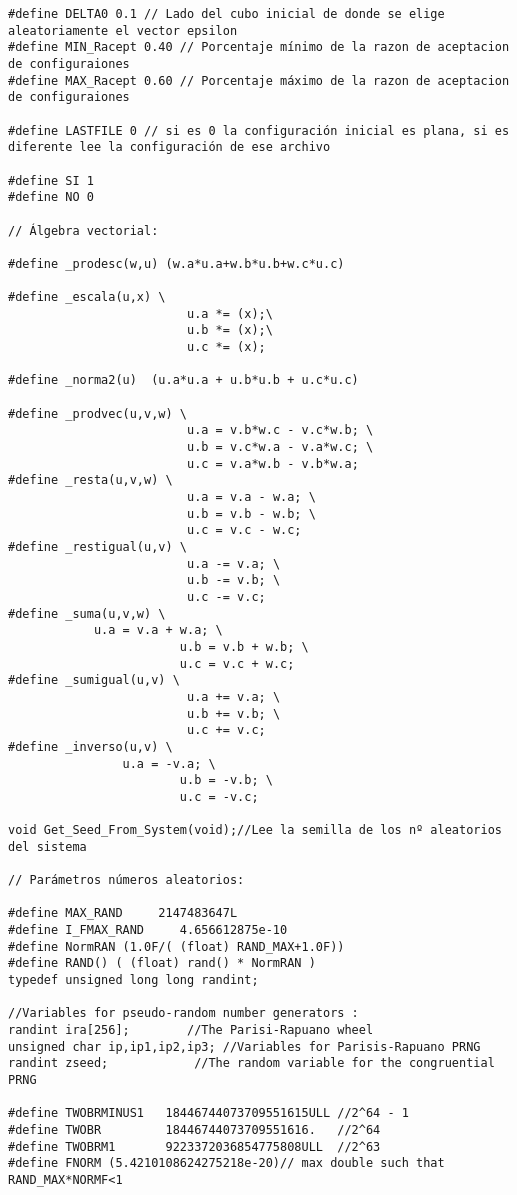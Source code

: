 \begin{verbatim}
#define DELTA0 0.1 // Lado del cubo inicial de donde se elige aleatoriamente el vector epsilon
#define MIN_Racept 0.40 // Porcentaje mínimo de la razon de aceptacion de configuraiones
#define MAX_Racept 0.60 // Porcentaje máximo de la razon de aceptacion de configuraiones

#define LASTFILE 0 // si es 0 la configuración inicial es plana, si es diferente lee la configuración de ese archivo
 
#define SI 1
#define NO 0

// Álgebra vectorial:

#define _prodesc(w,u) (w.a*u.a+w.b*u.b+w.c*u.c)

#define _escala(u,x) \
                         u.a *= (x);\
                         u.b *= (x);\
                         u.c *= (x);

#define _norma2(u)  (u.a*u.a + u.b*u.b + u.c*u.c)

#define _prodvec(u,v,w) \
                         u.a = v.b*w.c - v.c*w.b; \
                         u.b = v.c*w.a - v.a*w.c; \
                         u.c = v.a*w.b - v.b*w.a;
#define _resta(u,v,w) \
                         u.a = v.a - w.a; \
                         u.b = v.b - w.b; \
                         u.c = v.c - w.c;
#define _restigual(u,v) \
                         u.a -= v.a; \
                         u.b -= v.b; \
                         u.c -= v.c;
#define _suma(u,v,w) \
			u.a = v.a + w.a; \
                        u.b = v.b + w.b; \
                        u.c = v.c + w.c;
#define _sumigual(u,v) \
                         u.a += v.a; \
                         u.b += v.b; \
                         u.c += v.c;
#define _inverso(u,v) \
		        u.a = -v.a; \
                        u.b = -v.b; \
                        u.c = -v.c;

void Get_Seed_From_System(void);//Lee la semilla de los nº aleatorios del sistema

// Parámetros números aleatorios:

#define MAX_RAND     2147483647L
#define I_FMAX_RAND     4.656612875e-10
#define NormRAN (1.0F/( (float) RAND_MAX+1.0F))
#define RAND() ( (float) rand() * NormRAN )
typedef unsigned long long randint;

//Variables for pseudo-random number generators :
randint ira[256];        //The Parisi-Rapuano wheel
unsigned char ip,ip1,ip2,ip3; //Variables for Parisis-Rapuano PRNG
randint zseed;            //The random variable for the congruential PRNG

#define TWOBRMINUS1   18446744073709551615ULL //2^64 - 1
#define TWOBR         18446744073709551616.   //2^64
#define TWOBRM1       9223372036854775808ULL  //2^63
#define FNORM (5.4210108624275218e-20)// max double such that RAND_MAX*NORMF<1


\end{verbatim}
